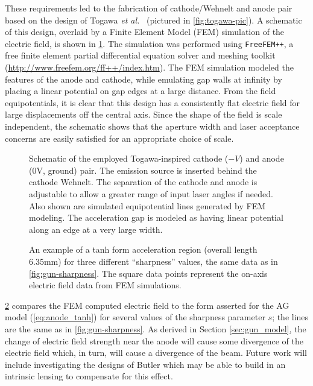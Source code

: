 These requirements led to the fabrication of cathode/Wehnelt and anode pair based on the design of Togawa \textit{et al.}~\cite{togawa_ceb6_2007} (pictured in \ref{fig:togawa-pic}).
A schematic of this design, overlaid by a Finite Element Model (FEM) simulation of the electric field, is shown in \ref{fig:gun-field}.
The simulation was performed using \texttt{FreeFEM++}, a free finite element partial differential equation solver and meshing toolkit (\url{http://www.freefem.org/ff++/index.htm}).
The FEM simulation modeled the features of the anode and cathode, while emulating gap walls at infinity by placing a linear potential on gap edges at a large distance.
From the field equipotentials, it is clear that this design has a consistently flat electric field for large displacements off the central axis.
Since the shape of the field is scale independent, the schematic shows that the aperture width and laser acceptance concerns are easily satisfied for an appropriate choice of scale.

\begin{figure}
  \centering
  
  \caption[Schematic of the employed Togawa-inspired custom cathode-anode pair]{
    Schematic of the employed Togawa-inspired cathode ($-V$) and anode (0V, ground) pair.
    The emission source is inserted behind the cathode Wehnelt.
    The separation of the cathode and anode is adjustable to allow a greater range of input laser angles if needed. 
    Also shown are simulated equipotential lines generated by FEM modeling.
    The acceleration gap is modeled as having linear potential along an edge at a very large width. 
  }
  \label{fig:gun-field}
\end{figure}

\begin{figure}
  \centering

  \begin{tikzpicture}
    
  \end{tikzpicture}

  \caption[An example of a tanh form acceleration region for three different ``sharpness'' values]{
    An example of a tanh form acceleration region (overall length 6.35mm) for three different ``sharpness'' values, the same data as in \ref{fig:gun-sharpness}.
    The square data points represent the on-axis electric field data from FEM simulations.
  }
  \label{fig:field_on_axis_fem}
\end{figure}

\ref{fig:field_on_axis_fem} compares the FEM computed electric field to the form asserted for the AG model (\ref{eq:anode_tanh}) for several values of the sharpness parameter $s$; the lines are the same as in \ref{fig:gun-sharpness}.
As derived in Section \ref{sec:gun_model}, the change of electric field strength near the anode will cause some divergence of the electric field which, in turn, will cause a divergence of the beam.
Future work will include investigating the designs of Butler %
which may be able to build in an intrinsic lensing to compensate for this effect.

